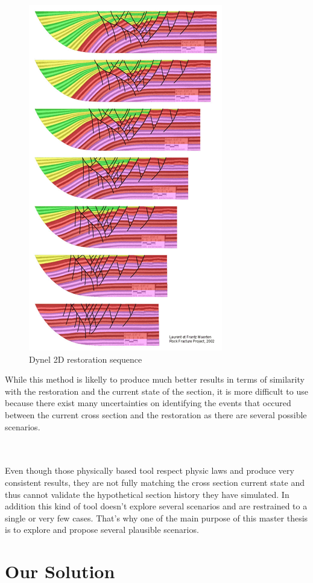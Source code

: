 \documentclass[12pt, a4paper]{memoir} %
\begin{document}
 \begin{figure}[H]
	\centering
	\includegraphics[scale=0.5]{dynel2D.png}
	\caption{Dynel 2D restoration sequence}
\end{figure}

 
 While this method is likelly to produce much better results in terms of similarity with the restoration and the current state of the section, it is more difficult to use because there exist many uncertainties on identifying the events that occured between the current cross section and the restoration as there are several possible scenarios. \\\\\

Even though those physically based tool respect physic laws and produce very consistent results, they are not fully matching the cross section current state and thus cannot validate the hypothetical section history they have simulated. In addition this kind of tool doesn't explore several scenarios and are restrained to a single or very few cases. 
That's why one of the main purpose of this master thesis is to explore and propose several plausible scenarios.

\section{Our Solution}
\end{document}
